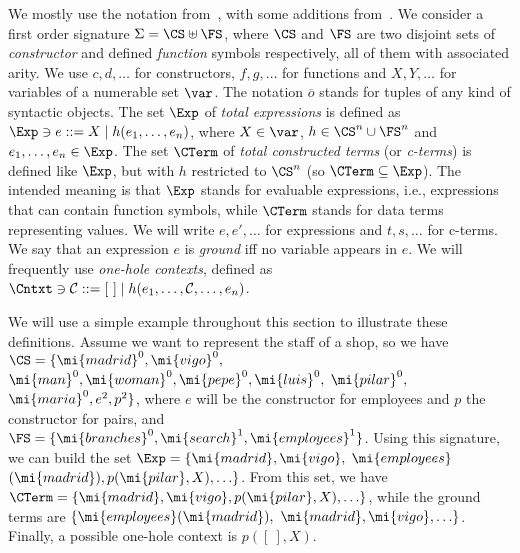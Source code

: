 

We mostly use the notation from~\cite{baader-nipkow}, with some additions from~\cite{Lopez-FraguasRS09-RTA09}. 
We consider a first order signature $\Sigma = \CS \uplus \FS$, where $\CS$ and $\FS$ are two disjoint
sets of \emph{constructor} and defined \emph{function} symbols respectively, all of them with associated
arity. We use $c,d,\ldots$ for constructors, $f,g,\ldots$ for functions and $X,Y,\ldots$ for variables of a
numerable set  $\var$. The notation $\overline{o}$ stands for tuples of any kind of syntactic objects. 
The set $\Exp$ of {\it total expressions} is defined as $\Exp \ni e::= X \mid h(e_1,\ldots,e_n)$, where 
$X\in\var$, $h\in \CS^n\cup \FS^n$ and $e_1,\ldots,e_n\in \Exp$. The set $\CTerm$ of
{\it total constructed terms}
(or {\it  c-terms}) is defined like $\Exp$, but with $h$ restricted to $\CS^n$ (so $\CTerm\subseteq \Exp$).
The intended meaning is that $\Exp$ stands for evaluable expressions, i.e., expressions that can contain 
function symbols, while $\CTerm$ stands for data terms representing {values}. 
We will write $e,e',\ldots$ for expressions and $t,s,\ldots$ for c-terms. 
We say that an expression $e$ is \emph{ground} iff no variable appears in $e$. 
We will frequently use \emph{one-hole contexts}, defined as $\Cntxt\ni {\cal C} ::= [\ ] \mid h(e_1,\ldots,{\cal C},\ldots,e_n)$. 


\begin{example}\label{ex:clerks}
We will use a simple example throughout this section to illustrate these definitions. Assume we want to represent
the staff of a shop, so we have $\CS = \{\mi{madrid}^0, \mi{vigo}^0,$
$\mi{man}^0, \mi{woman}^0, \mi{pepe}^0, \mi{luis}^0,$ $\mi{pilar}^0,$ $\mi{maria}^0, e^2, p^2\}$,
where $e$ will be the constructor for employees and $p$ the constructor for pairs, and
$\FS = \{\mi{branches}^0, \mi{search}^1, \mi{employees}^1\}$.
Using this signature, we can build the set $\Exp = \{\mi{madrid}, \mi{vigo},$ $\mi{employees}$ $(\mi{madrid}),
p(\mi{pilar}, X), \ldots\}$. From this set, we have $\CTerm = \{\mi{madrid}, \mi{vigo},
p(\mi{pilar}, X), \ldots\}$,
while the ground terms are $\{\mi{employees}(\mi{madrid}),$ $\mi{madrid}, \mi{vigo}, \ldots\}$.
Finally, a possible one-hole context is $p([\ ], X)$.
\end{example}

